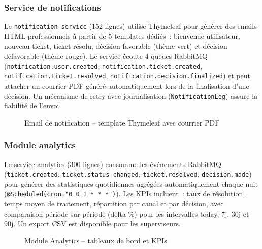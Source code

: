 \subsubsection{Service de notifications}

Le \texttt{notification-service} (152 lignes) utilise Thymeleaf pour g\'{e}n\'{e}rer des emails HTML professionnels \`{a} partir de 5 templates d\'{e}di\'{e}s~: bienvenue utilisateur, nouveau ticket, ticket r\'{e}solu, d\'{e}cision favorable (th\`{e}me vert) et d\'{e}cision d\'{e}favorable (th\`{e}me rouge). Le service \'{e}coute 4 queues RabbitMQ (\texttt{notification.user.created}, \texttt{notification.ticket.created}, \texttt{notification.ticket.resolved}, \texttt{notification.decision.finalized}) et peut attacher un courrier PDF g\'{e}n\'{e}r\'{e} automatiquement lors de la finalisation d'une d\'{e}cision. Un m\'{e}canisme de retry avec journalisation (\texttt{NotificationLog}) assure la fiabilit\'{e} de l'envoi.

\begin{figure}[H]
    \centering
    \caption{Email de notification -- template Thymeleaf avec courrier PDF}
    \label{fig:notification}
\end{figure}

\subsubsection{Module analytics}

Le service analytics (300 lignes) consomme les \'{e}v\'{e}nements RabbitMQ (\texttt{ticket.created}, \texttt{ticket.status-changed}, \texttt{ticket.resolved}, \texttt{decision.made}) pour g\'{e}n\'{e}rer des statistiques quotidiennes agr\'{e}g\'{e}es automatiquement chaque nuit (\texttt{@Scheduled(cron="0 0 1 * * *")}). Les KPIs incluent~: taux de r\'{e}solution, temps moyen de traitement, r\'{e}partition par canal et par d\'{e}cision, avec comparaison p\'{e}riode-sur-p\'{e}riode (delta \%) pour les intervalles today, 7j, 30j et 90j. Un export CSV est disponible pour les superviseurs.

\begin{figure}[H]
    \centering
    \caption{Module Analytics -- tableaux de bord et KPIs}
    \label{fig:analytics}
\end{figure}


